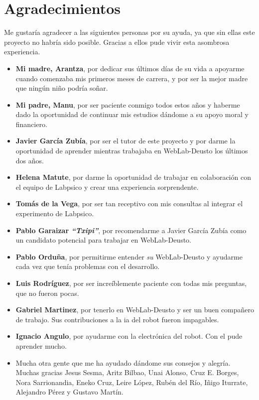 \chapter*{Agradecimientos}

Me gustaría agradecer a las siguientes personas por su ayuda, ya que sin ellas este proyecto no
habría sido posible. Gracias a ellos pude vivir esta asombrosa experiencia.

\begin{itemize}
	\item \textbf{Mi madre, Arantza}, por dedicar sus últimos días de su vida a apoyarme cuando
	comenzaba mis primeros meses de carrera, y por ser la mejor madre que ningún niño podría soñar.

	\item \textbf{Mi padre, Manu}, por ser paciente conmigo todos estos años y haberme dado la
	oportunidad de continuar mis estudios dándome a su apoyo moral y financiero.

	\item \textbf{Javier García Zubía}, por ser el tutor de este proyecto y por darme la oportunidad
	de aprender mientras trabajaba en WebLab-Deusto los últimos dos años.

	\item \textbf{Helena Matute}, por darme la oportunidad de trabajar en colaboración con el equipo
	de Labpsico y crear una experiencia sorprendente.

	\item \textbf{Tomás de la Vega}, por ser tan receptivo con mis consultas al integrar el
	experimento de Labpsico.

	\item \textbf{Pablo Garaizar \emph{``Txipi''}}, por recomendarme a Javier García Zubía como un
	candidato potencial para trabajar en WebLab-Deusto.

	\item \textbf{Pablo Orduña}, por permitirme entender \emph{su} WebLab-Deusto y ayudarme cada
	vez que tenía problemas con el desarrollo.

	\item \textbf{Luis Rodríguez}, por ser increíblemente paciente con todas mis preguntas, que no
	fueron pocas.

	\item \textbf{Gabriel Martinez}, por tenerlo en WebLab-Deusto y ser un buen compañero de
	trabajo. Sus contribuciones a la \acrshort{ia} del robot fueron impagables.

	\item \textbf{Ignacio Angulo}, por ayudarme con la electrónica del robot. Con el pude aprender
	mucho.

	\item Mucha otra gente que me ha ayudado dándome sus consejos y alegría. Muchas gracias Jesus
	Sesma, Aritz Bilbao, Unai Alonso, Cruz E. Borges, Nora Sarrionandia, Eneko Cruz, Leire López,
	Rubén del Río, Iñigo Iturrate, Alejandro Pérez y Gustavo Martín.
\end{itemize}
